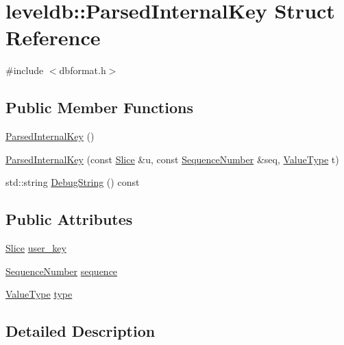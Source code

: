 \hypertarget{structleveldb_1_1_parsed_internal_key}{}\section{leveldb\+:\+:Parsed\+Internal\+Key Struct Reference}
\label{structleveldb_1_1_parsed_internal_key}


{\ttfamily \#include $<$dbformat.\+h$>$}

\subsection*{Public Member Functions}
\begin{DoxyCompactItemize}
\item 
\hyperlink{structleveldb_1_1_parsed_internal_key_a23885ae8c8ccb36e01cdb3469ea21d67}{Parsed\+Internal\+Key} ()
\item 
\hyperlink{structleveldb_1_1_parsed_internal_key_acc24f6ddeb4223d0484613076a48a9a1}{Parsed\+Internal\+Key} (const \hyperlink{classleveldb_1_1_slice}{Slice} \&u, const \hyperlink{namespaceleveldb_a5481ededd221c36d652c371249f869fa}{Sequence\+Number} \&seq, \hyperlink{namespaceleveldb_acc038cb0d608414730cafa459a4ba866}{Value\+Type} t)
\item 
std\+::string \hyperlink{structleveldb_1_1_parsed_internal_key_abda4655ea6857f75dcb8f409873207d5}{Debug\+String} () const 
\end{DoxyCompactItemize}
\subsection*{Public Attributes}
\begin{DoxyCompactItemize}
\item 
\hyperlink{classleveldb_1_1_slice}{Slice} \hyperlink{structleveldb_1_1_parsed_internal_key_aa6e30fcf3c95fc1485d60fa08efe2b9d}{user\+\_\+key}
\item 
\hyperlink{namespaceleveldb_a5481ededd221c36d652c371249f869fa}{Sequence\+Number} \hyperlink{structleveldb_1_1_parsed_internal_key_a3ab7f4382bc026081875fde4dea95e61}{sequence}
\item 
\hyperlink{namespaceleveldb_acc038cb0d608414730cafa459a4ba866}{Value\+Type} \hyperlink{structleveldb_1_1_parsed_internal_key_ac7c10a6f60f93982b886ad1fbbafd6c2}{type}
\end{DoxyCompactItemize}


\subsection{Detailed Description}


